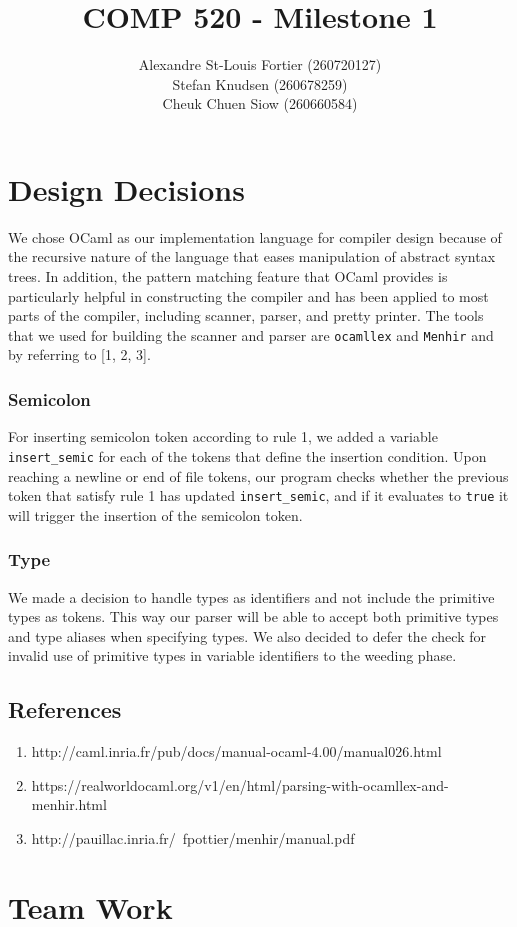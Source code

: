 \documentclass{article}
\begin{document}
\pagestyle{empty}

\title{COMP 520 - Milestone 1}
\author{
Alexandre St-Louis Fortier (260720127)\\
Stefan Knudsen (260678259)\\
Cheuk Chuen Siow (260660584)}
\maketitle

\section*{Design Decisions}
We chose OCaml as our implementation language for compiler design because of the recursive nature of the language that eases manipulation of abstract syntax trees. In addition, the pattern matching feature that OCaml provides is particularly helpful in constructing the compiler and has been applied to most parts of the compiler, including scanner, parser, and pretty printer. The tools that we used for building the scanner and parser are \verb|ocamllex| and \verb|Menhir| and by referring to [1, 2, 3].

\subsubsection*{Semicolon}
For inserting semicolon token according to rule 1, we added a variable \verb|insert_semic| for each of the tokens that define the insertion condition. Upon reaching a newline or end of file tokens, our program checks whether the previous token that satisfy rule 1 has updated \verb|insert_semic|, and if it evaluates to \verb|true| it will trigger the insertion of the semicolon token.

\subsubsection*{Type}
We made a decision to handle types as identifiers and not include the primitive types as tokens. This way our parser will be able to accept both primitive types and type aliases when specifying types. We also decided to defer the check for invalid use of primitive types in variable identifiers to the weeding phase.

\subsection*{References}
\begin{enumerate}
  \item http://caml.inria.fr/pub/docs/manual-ocaml-4.00/manual026.html
  \item https://realworldocaml.org/v1/en/html/parsing-with-ocamllex-and-menhir.html
  \item http://pauillac.inria.fr/~fpottier/menhir/manual.pdf
\end{enumerate}

\section*{Team Work}
\end{document}
